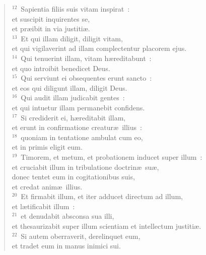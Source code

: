 \begin{flushleft}\begin{verse}${}^{12}$~Sapientia filiis suis vitam inspirat~:\\ et suscipit inquirentes se,\\ et pr\ae ibit in via justiti\ae .\\
${}^{13}$~Et qui illam diligit, diligit vitam,\\ et qui vigilaverint ad illam complectentur placorem ejus.\\
${}^{14}$~Qui tenuerint illam, vitam h\ae reditabunt~:\\ et quo introibit benedicet Deus.\\
${}^{15}$~Qui serviunt ei obsequentes erunt sancto~:\\ et eos qui diligunt illam, diligit Deus.\\
${}^{16}$~Qui audit illam judicabit gentes~:\\ et qui intuetur illam permanebit confidens.\\
${}^{17}$~Si crediderit ei, h\ae reditabit illam,\\ et erunt in confirmatione creatur\ae\ illius~:\\
${}^{18}$~quoniam in tentatione ambulat cum eo,\\ et in primis eligit eum.\\
${}^{19}$~Timorem, et metum, et probationem inducet super illum~:\\ et cruciabit illum in tribulatione doctrin\ae\ su\ae ,\\ donec tentet eum in cogitationibus suis,\\ et credat anim\ae\ illius.\\
${}^{20}$~Et firmabit illum, et iter adducet directum ad illum,\\ et l\ae tificabit illum~:\\
${}^{21}$~et denudabit absconsa sua illi,\\ et thesaurizabit super illum scientiam et intellectum justiti\ae .\\
${}^{22}$~Si autem oberraverit, derelinquet eum,\\ et tradet eum in manus inimici sui.\end{verse}\end{flushleft}


